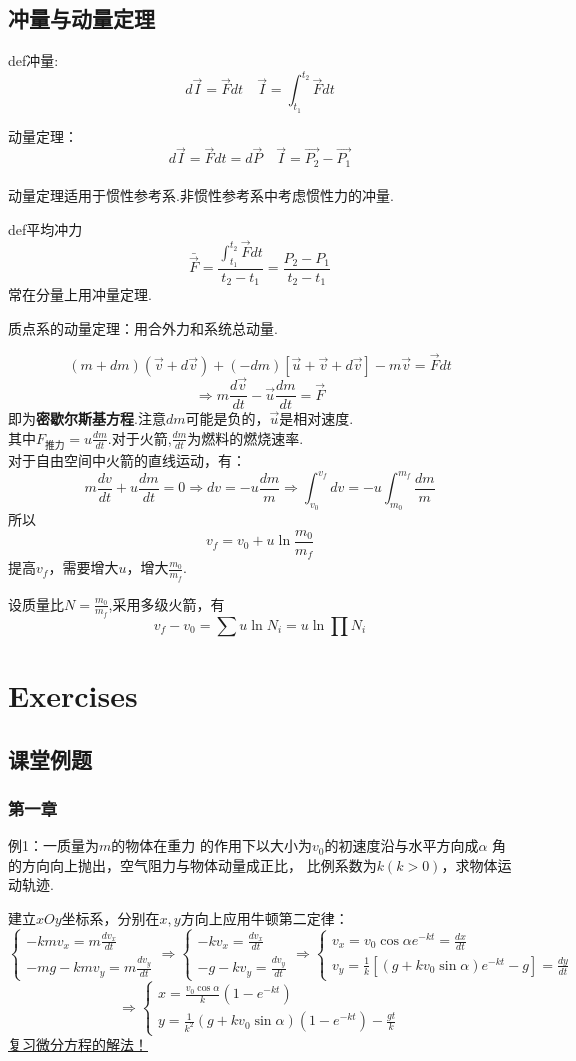 \documentclass[10pt,a4paper]{article}
\begin{document}
\subsection{冲量与动量定理}
def冲量:
\[d\vec{I}=\vec{F}dt\quad \vec{I}=\int_{t_1}^{t_2}\vec{F}dt\]

动量定理：
\[d\vec{I}=\vec{F}dt=d\vec{P}\quad \vec{I}=\vec{P_2}-\vec{P_1}\]\\
动量定理适用于惯性参考系.非惯性参考系中考虑惯性力的冲量.

def平均冲力
\[\bar{\vec{F}}=\frac{\int_{t_1}^{t_2}\vec{F}dt}{t_2-t_1}=\frac{P_2-P_1}{t_2-t_1}\]
常在分量上用冲量定理.

质点系的动量定理：用合外力和系统总动量.

\[(m+dm)(\vec{v}+d\vec{v})+(-dm)[\vec{u}+\vec{v}+d\vec{v}]-m\vec{v}=\vec{F}dt\]
\[\Rightarrow m\frac{d\vec{v}}{dt}-\vec{u}\frac{dm}{dt}=\vec{F}\]
即为\textbf{密歇尔斯基方程}.注意$dm$可能是负的，$\vec{u}$是相对速度.
\\其中$F_\text{推力}=u\frac{dm}{dt}$.对于火箭,$\frac{dm}{dt}$为燃料的燃烧速率.\\
对于自由空间中火箭的直线运动，有：
\[m\frac{dv}{dt}+u\frac{dm}{dt}=0
\Rightarrow dv=-u\frac{dm}{m}\Rightarrow
\int_{v_0}^{v_f}dv=-u\int_{m_0}^{m_f}\frac{dm}{m}
\]
所以\[v_f=v_0+u\ln\frac{m_0}{m_f}\]
提高$v_f$，需要增大$u$，增大$\frac{m_0}{m_f}$.

设质量比$N=\frac{m_0}{m_f}$,采用多级火箭，有
\[v_f-v_0=\sum u\ln N_i=u \ln \prod N_i\]
\section{Exercises}
\subsection{课堂例题}
\subsubsection{第一章}
例1：一质量为$m$的物体在重力 的作用下以大小为$v_0$的初速度沿与水平方向成$\alpha$
角的方向向上抛出，空气阻力与物体动量成正比，
比例系数为$k(k>0)$，求物体运动轨迹.

建立$xOy$坐标系，分别在$x,y$方向上应用牛顿第二定律：
\[
\begin{cases}
-kmv_x=m\frac{dv_x}{dt}\\
-mg-kmv_y=m\frac{dv_y}{dt}
\end{cases}\Rightarrow
\begin{cases}
-kv_x=\frac{dv_x}{dt}\\
-g-kv_y=\frac{dv_y}{dt}
\end{cases}\Rightarrow
\begin{cases}
v_x=v_0\cos\alpha e^{-kt}=\frac{dx}{dt}\\
v_y=\frac{1}{k}[(g+kv_0\sin\alpha)e^{-kt}-g]=\frac{dy}{dt}
\end{cases}\]
\[
\Rightarrow
\begin{cases}
x=\frac{v_0\cos\alpha}{k}(1-e^{-kt})\\
y=\frac{1}{k^2}(g+kv_0\sin\alpha)(1-e^{-kt})-\frac{gt}{k}
\end{cases}
\]\underline{复习微分方程的解法！}
\end{document}
